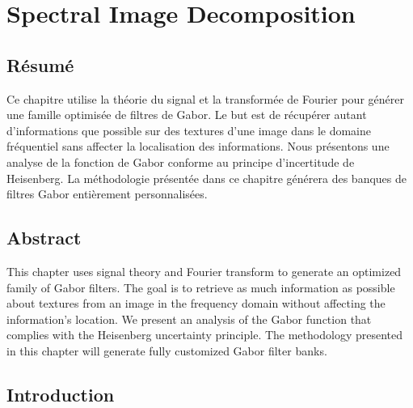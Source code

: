 %

\chapter{Spectral Image Decomposition}\label{ch:spectral_image_decomposition}

\section*{Résumé}
\noindent Ce chapitre utilise la théorie du signal et la transformée de Fourier pour générer une famille optimisée de filtres de Gabor. Le but est de récupérer autant d'informations que possible sur des textures d'une image dans le domaine fréquentiel sans affecter la localisation des informations. Nous présentons une analyse de la fonction de Gabor conforme au principe d'incertitude de Heisenberg. La méthodologie présentée dans ce chapitre générera des banques de filtres Gabor entièrement personnalisées.

\section*{Abstract}
\noindent This chapter uses signal theory and Fourier transform to generate an optimized family of Gabor filters. The goal is to retrieve as much information as possible about textures from an image in the frequency domain without affecting the information's location. We present an analysis of the Gabor function that complies with the Heisenberg uncertainty principle. The methodology presented in this chapter will generate fully customized Gabor filter banks. 

\section{Introduction}

